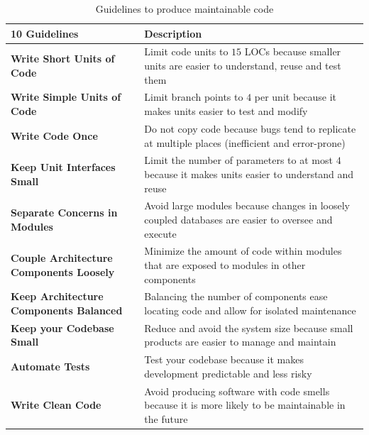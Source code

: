 \documentclass[10pt,conference]{IEEEtran}
\begin{document}
\begin{table}[h]
	\caption{Guidelines to produce maintainable code}
\begin{tabular}{L{2.5cm}L{5.5cm}}

\toprule
\textbf{10 Guidelines} & \textbf{Description}\\
\midrule
\textbf{Write Short Units of Code} & Limit code units to $15$ LOCs because smaller
 units are easier to understand, reuse and test them\\\midrule
\textbf{Write Simple Units of Code} & Limit branch points to $4$ per unit because
it makes units easier to test and modify \\\midrule
\textbf{Write Code Once} & Do not copy code because bugs tend to replicate at
multiple places (inefficient and error-prone)\\\midrule
\textbf{Keep Unit Interfaces Small} & Limit the number of parameters to at most
$4$ because it makes units easier to understand and reuse\\\midrule
\textbf{Separate Concerns in Modules} & Avoid large modules because changes in
loosely coupled databases are easier to oversee and execute\\\midrule
\textbf{Couple Architecture Components Loosely} & Minimize the amount of code
within modules that are exposed to modules in other components\\\midrule
\textbf{Keep Architecture Components Balanced} & Balancing the number of
components ease locating code and allow for isolated maintenance\\\midrule
\textbf{Keep your Codebase Small} & Reduce and avoid the system size because
small products are easier to manage and maintain\\\midrule
\textbf{Automate Tests} & Test your codebase because it makes development
predictable and less risky\\\midrule
\textbf{Write Clean Code} & Avoid producing software with code smells because
it is more likely to be maintainable in the future\\
\bottomrule
\end{tabular}
\label{tab:guidelines}
\end{table}
\end{document}
